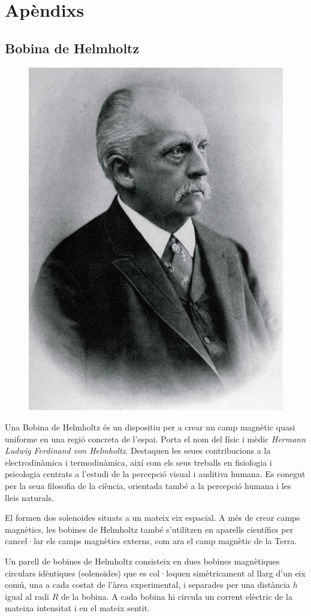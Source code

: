 \documentclass[11pt]{article}
\begin{document}
\clearpage
\section{Apèndixs}
    \vspace{0.4cm}
    \subsection{Bobina de Helmholtz}\label{appendix:helmholtz}
        \vspace{0.2cm}
        \begin{figure}
            \vspace{-0.89cm}
            \begin{center}
                \includegraphics[width=.245\textwidth]{fotos/helmholtz.jpeg}
            \end{center}
        \end{figure}
        Una Bobina de Helmholtz és un dispositiu per a crear un camp magnètic quasi uniforme en una regió concreta de l'espai. Porta el nom del físic i mèdic \textit{Hermann Ludwig Ferdinand von Helmholtz}. Destaquen les seues contribucions a la electrodinàmica i termodinàmica, així com els seus treballs en fisiologia i psicologia centrats a l'estudi de la percepció visual i auditiva humana. Es conegut per la seua filosofia de la ciència, orientada també a la percepció humana i les lleis naturals.
        
        \vspace{0.4cm}El formen dos solenoides situats a un mateix eix espacial. A més de crear camps magnètics, les bobines de Helmholtz també s'utilitzen en aparells científics per cancel·lar els camps magnètics externs, com ara el camp magnètic de la Terra.
        
        \vspace{0.5cm}\hspace{-0cm}Un parell de bobines de Helmholtz consisteix en dues bobines magnètiques circulars idèntiques (solenoides) que es col·loquen simètricament al llarg d'un eix comú, una a cada costat de l'àrea experimental, i separades per una distància $h$ igual al radi $R$ de la bobina. A cada bobina hi circula un corrent elèctric de la mateixa intensitat i en el mateix sentit.
\end{document}
